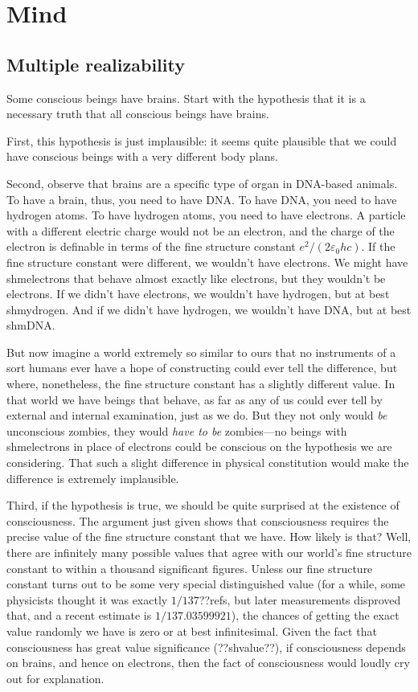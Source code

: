 \def\mychapter{VI}

\chapter{Mind}\label{ch:mind}
\section{Multiple realizability}
Some conscious beings have brains. Start with the hypothesis that it is a necessary 
truth that all conscious beings have brains. 

First, this hypothesis is just implausible: it seems quite plausible that we could have
conscious beings with a very different body plans. 

Second, observe that brains are a specific type of organ in DNA-based animals.
To have a brain, thus, you need to have DNA. To have DNA, you need to have hydrogen
atoms. To have hydrogen atoms, you need to have electrons. A particle with a different 
electric charge would not be an electron, and the charge of the electron is definable in terms of 
the fine structure constant $e^2/(2\varepsilon_0 hc)$. If the fine structure constant
were different, we wouldn't have electrons. We might have shmelectrons that behave almost 
exactly like electrons, but they wouldn't be electrons. If we didn't have electrons, we wouldn't
have hydrogen, but at best shmydrogen. And if we didn't have hydrogen, we wouldn't have DNA,
but at best shmDNA. 

But now imagine a world extremely so similar to ours that no instruments of a sort
humans ever have a hope of constructing could ever tell the difference, but where, nonetheless,
the fine structure constant has a slightly different value. In that world we have beings that
behave, as far as any of us could ever tell by external and internal examination, just as we 
do. But they not only would \textit{be} unconscious zombies, they would \textit{have to be}
zombies---no beings with shmelectrons in place of electrons could be conscious on the hypothesis 
we are considering. That such a slight difference in physical constitution would make the
difference is extremely implausible. 

Third, if the hypothesis is true, we should be quite surprised at the existence
of consciousness. The argument just given shows that consciousness requires the precise value of
the fine structure constant that we have. How likely is that? Well, there are infinitely
many possible values that agree with our world's fine structure constant to within a thousand
significant figures. Unless our fine structure constant turns out to be some very special distinguished
value (for a while, some physicists thought it was exactly $1/137$??refs, but later measurements 
disproved that, and a recent estimate is $1/137.03599921$), the chances of getting the exact value
randomly we have is zero or at best infinitesimal. Given the fact that consciousness has great
value significance (??shvalue??), if consciousness depends on brains, and hence on electrons, then
the fact of consciousness would loudly cry out for explanation. 

